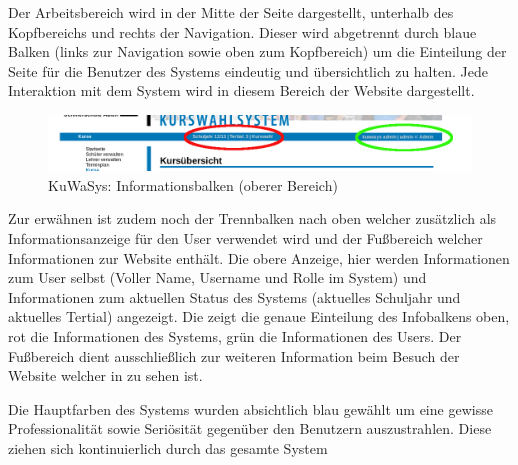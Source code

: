 Der Arbeitsbereich wird in der Mitte der Seite dargestellt, unterhalb des Kopfbereichs und rechts der Navigation. 
Dieser wird abgetrennt durch blaue Balken (links zur Navigation sowie oben zum Kopfbereich) um die Einteilung der Seite für die Benutzer des Systems eindeutig und übersichtlich zu halten.
Jede Interaktion mit dem System wird in diesem Bereich der Website dargestellt. 

\begin{figure}[h]
 \begin{center}
   \includegraphics[scale=0.4]{img/informationbar_KuWaSys.png}
 \end{center}
 \caption[\textbf{KuWaSys: Informationsbalken (oberer Bereich)}]{KuWaSys: Informationsbalken (oberer Bereich)}
 \label{fig:infobar_KuWaSys}
\end{figure}

Zur erwähnen ist zudem noch der Trennbalken nach oben welcher zusätzlich als Informationsanzeige für den User verwendet wird und der Fußbereich welcher Informationen zur Website enthält. 
Die obere Anzeige, hier werden Informationen zum User selbst (Voller Name, Username und Rolle im System) und Informationen zum aktuellen Status des Systems (aktuelles Schuljahr und aktuelles Tertial) angezeigt.
Die  zeigt die genaue Einteilung des Infobalkens oben, rot die Informationen des Systems, grün die Informationen des Users.
Der Fußbereich dient ausschließlich zur weiteren Information beim Besuch der Website welcher in  zu sehen ist.  

Die Hauptfarben des Systems wurden absichtlich blau gewählt um eine gewisse Professionalität sowie Seriösität gegenüber den Benutzern auszustrahlen. Diese ziehen sich kontinuierlich durch das gesamte System

